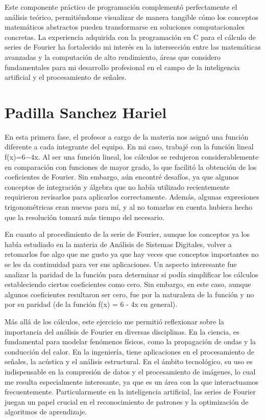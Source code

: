 {Este componente práctico de programación complementó perfectamente el análisis teórico, permitiéndome visualizar de manera tangible cómo los conceptos matemáticos abstractos pueden transformarse en soluciones computacionales concretas. La experiencia adquirida con la programación en C para el cálculo de series de Fourier ha fortalecido mi interés en la intersección entre las matemáticas avanzadas y la computación de alto rendimiento, áreas que considero fundamentales para mi desarrollo profesional en el campo de la inteligencia artificial y el procesamiento de señales.

\newpage
\section{Padilla Sanchez Hariel}

En esta primera fase, el profesor a cargo de la materia nos asignó una función diferente a cada integrante del equipo. En mi caso, trabajé con la función lineal f(x)=6−4x. Al ser una función lineal, los cálculos se redujeron considerablemente en comparación con funciones de mayor grado, lo que facilitó la obtención de los coeficientes de Fourier. Sin embargo, aún encontré desafíos, ya que algunos conceptos de integración y álgebra que no había utilizado recientemente requirieron revisarlos para aplicarlos correctamente. Además, algunas expresiones trigonométricas eran nuevas para mí, y al no tomarlas en cuenta hubiera hecho que la resolución tomará más tiempo del necesario.

En cuanto al procedimiento de la serie de Fourier, aunque los conceptos ya los había estudiado en la materia de Análisis de Sistemas Digitales, volver a retomarlos fue algo que me gusto ya que hay veces que conceptos importantes no se les da continuidad para ver sus aplicaciones. Un aspecto interesante fue analizar la paridad de la función para determinar si podía simplificar los cálculos estableciendo ciertos coeficientes como cero. Sin embargo, en este caso, aunque algunos coeficientes resultaron ser cero, fue por la naturaleza de la función y no por su paridad (de la función f(x) = 6 - 4x en general).

Más allá de los cálculos, este ejercicio me permitió reflexionar sobre la importancia del análisis de Fourier en diversas disciplinas. En la ciencia, es fundamental para modelar fenómenos físicos, como la propagación de ondas y la conducción del calor. En la ingeniería, tiene aplicaciones en el procesamiento de señales, la acústica y el análisis estructural. En el ámbito tecnológico, su uso es indispensable en la compresión de datos y el procesamiento de imágenes, lo cual me resulta especialmente interesante, ya que es un área con la que interactuamos frecuentemente. Particularmente en la inteligencia artificial, las series de Fourier juegan un papel crucial en el reconocimiento de patrones y la optimización de algoritmos de aprendizaje.

}
